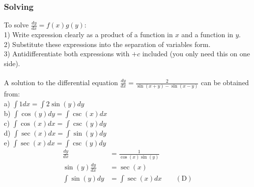 \documentclass[a4paper,twoside,10pt]{article}
\newenvironment{examquestion}[1]{%
	\mbox{}\\\tcolorbox[beamer,breakable,%
	title=Exam-style Question: #1,standard jigsaw,opacityback=0, colframe=red!75!black, boxrule=2pt]}{\endtcolorbox\mbox{}\\}
\begin{document}
			\subsubsection{Solving}
				To solve $\displaystyle\frac{dy}{dx}=f(x)g(y)$:\\
				1) Write expression clearly as a product of a function in $x$ and a function in $y$.\\
				2) Substitute these expressions into the separation of variables form.\\
				3) Antidifferentiate both expressions with $+c$ included (you only need this on one side).\\
			\begin{examquestion}{2018 Exam 2 Question A9}
				A solution to the differential equation $\displaystyle \frac{dy}{dx}=\frac{2}{\sin(x+y)-\sin(x-y)}$ can be obtained from:\\
				a) $\displaystyle \int1dx=\int2\sin(y)dy$\\
				b) $\displaystyle \int\cos(y)dy=\int\csc(x)dx$\\
				c) $\displaystyle \int\cos(x)dx=\int\csc(y)dy$\\
				d) $\displaystyle \int\sec(x)dx=\int\sin(y)dy$\\
				e) $\displaystyle \int\sec(x)dx=\int\csc(y)dy$\\
				\begin{align*}
					\frac{dy}{dx}&=\frac{1}{\cos(x)\sin(y)} \\
					\sin(y)\frac{dy}{dx}&=\sec(x) \\
					\int\sin(y)dy&=\int\sec(x)dx \qquad \mathrm{(D)}
				\end{align*}
			\end{examquestion} 
\end{document}
